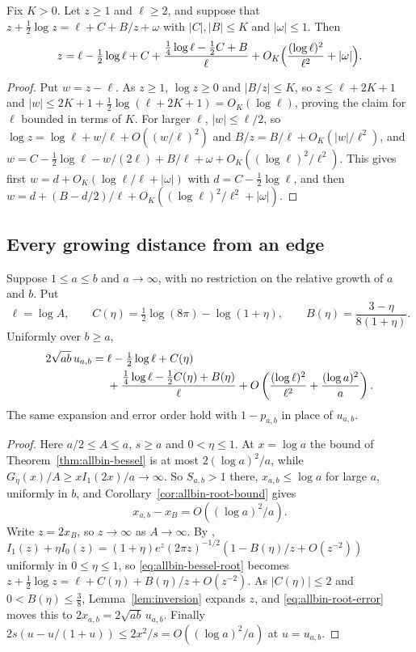 \begin{lemma}\label{lem:inversion}
Fix $K>0$. Let $z\ge1$ and $\ell\ge2$, and suppose that
$z+\tfrac12\log z=\ell+C+B/z+\omega$ with $|C|,|B|\le K$ and $|\omega|\le1$. Then
\[
z=\ell-\tfrac12\log\ell+C+\frac{\frac14\log\ell-\frac12C+B}{\ell}
+O_K\Bigl(\frac{(\log\ell)^2}{\ell^2}+|\omega|\Bigr).
\]
\end{lemma}
\begin{proof}
Put $w=z-\ell$. As $z\ge1$, $\log z\ge0$ and $|B/z|\le K$, so $z\le\ell+2K+1$
and $|w|\le2K+1+\frac12\log(\ell+2K+1)=O_K(\log\ell)$, proving the claim for
$\ell$ bounded in terms of $K$. For larger $\ell$, $|w|\le\ell/2$, so
$\log z=\log\ell+w/\ell+O((w/\ell)^2)$ and $B/z=B/\ell+O_K(|w|/\ell^2)$, and
$w=C-\frac12\log\ell-w/(2\ell)+B/\ell+\omega+O_K((\log\ell)^2/\ell^2)$. This
gives first $w=d+O_K(\log\ell/\ell+|\omega|)$ with $d=C-\frac12\log\ell$, and
then $w=d+(B-d/2)/\ell+O_K((\log\ell)^2/\ell^2+|\omega|)$.
\end{proof}

\subsection{Every growing distance from an edge}

\begin{theorem}\label{thm:allbin-expansion}
Suppose $1\le a\le b$ and $a\to\infty$, with no restriction on the relative
growth of $a$ and $b$. Put
\[
 \ell=\log A,\qquad
 C(\eta)=\tfrac12\log(8\pi)-\log(1+\eta),\qquad
 B(\eta)=\frac{3-\eta}{8(1+\eta)}.
\]
Uniformly over $b\ge a$,
\begin{align}
 2\sqrt{ab}\,u_{a,b}
 ={}&\ell-\tfrac12\log\ell+C(\eta)\notag\\
 &+\frac{\tfrac14\log\ell-\tfrac12C(\eta)+B(\eta)}{\ell}
 +O\left(\frac{(\log\ell)^2}{\ell^2}+\frac{(\log a)^2}{a}\right).
 \label{eq:allbin-expansion}
\end{align}
The same expansion and error order hold with $1-p_{a,b}$ in place of $u_{a,b}$.
\end{theorem}
\begin{proof}
Here $a/2\le A\le a$, $s\ge a$ and $0<\eta\le1$. At $x=\log a$ the bound
of Theorem~\ref{thm:allbin-bessel} is at most $2(\log a)^2/a$, while
$G_\eta(x)/A\ge xI_1(2x)/a\to\infty$. So $S_{a,b}>1$ there, $x_{a,b}\le\log a$
for large $a$, uniformly in $b$, and Corollary~\ref{cor:allbin-root-bound} gives
\begin{equation}\label{eq:allbin-root-error}
 x_{a,b}-x_B=O((\log a)^2/a).
\end{equation}
Write $z=2x_B$, so $z\to\infty$ as $A\to\infty$. By
\cite[Eq.~10.40.1]{dlmf},
$I_1(z)+\eta I_0(z)=(1+\eta)e^z(2\pi z)^{-1/2}(1-B(\eta)/z+O(z^{-2}))$
uniformly in $0\le\eta\le1$, so \eqref{eq:allbin-bessel-root} becomes
$z+\frac12\log z=\ell+C(\eta)+B(\eta)/z+O(z^{-2})$. As $|C(\eta)|\le2$ and
$0<B(\eta)\le\frac38$, Lemma~\ref{lem:inversion} expands $z$, and
\eqref{eq:allbin-root-error} moves this to $2x_{a,b}=2\sqrt{ab}\,u_{a,b}$.
Finally $2s(u-u/(1+u))\le2x^2/s=O((\log a)^2/a)$ at $u=u_{a,b}$.
\end{proof}

